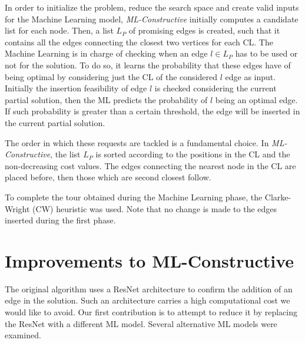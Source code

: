 \documentclass{article}
\begin{document}
In order to initialize the problem, reduce the search space and create valid inputs for the Machine Learning model, \emph{ML-Constructive} initially computes a candidate list for each node. 
Then, a list $L_P$ of promising edges is created, such that it contains all the edges connecting the closest two vertices for each CL.
The Machine Learning is in charge of checking when an edge $l \in L_P$ has to be used or not for the solution.
To do so, it learns the probability that these edges 
have of being optimal by considering just the CL of the considered $l$ edge as input.
Initially the insertion feasibility of edge $l$ is checked considering the current partial solution, then the ML predicts the probability of $l$ being an optimal edge. 
If such probability is greater than a certain threshold, the edge will be inserted in the current partial solution.

The order in which these requests are tackled is a fundamental choice.
In \emph{ML-Constructive}, the list $L_P$ is sorted according to the positions in the CL and the non-decreasing cost values.
The edges connecting the nearest node in the CL are placed before, then those which are second closest follow.

\vspace{5 pt}

To complete the tour obtained during the Machine Learning phase, the Clarke-Wright (CW) heuristic \cite{clarke:wright} was used. 
Note that no change is made to the edges inserted during the first phase.

\newpage

\section{Improvements to ML-Constructive} \label{improvements}

The original algorithm uses a ResNet architecture \cite{resnet} to confirm the addition of an edge in the solution.
Such an architecture carries a high computational cost we would like to avoid.
Our first contribution is to attempt to reduce it by replacing the ResNet with a different ML model.
Several alternative ML models were examined.
\end{document}
